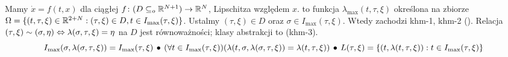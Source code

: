 Mamy $\dot x = f(t,x)$ dla ciągłej $f \colon (D \subseteq_o \mathbb{R}^{N+1}) \to \mathbb{R}^N$, Lipschitza względem $x$.
 to funkcja $\lambda_{\max}(t, \tau, \xi)$ określona na zbiorze $\Omega = \{(t, \tau, \xi) \in \mathbb{R}^{2+N} : (\tau, \xi) \in D, t \in I_{\max}(\tau, \xi)\}$.
Ustalmy $(\tau, \xi) \in D$ oraz $\sigma \in I_{\max}(\tau, \xi)$.
Wtedy zachodzi khm-1, khm-2 ().
Relacja $(\tau, \xi) \sim (\sigma, \eta) \Leftrightarrow \lambda(\sigma, \tau, \xi) = \eta$ na $D$ jest równoważności; klasy abstrakcji to  (khm-3).
\[
	I_{\max}(\sigma, \lambda(\sigma, \tau, \xi)) = I_{\max} (\tau, \xi) \, \bullet \,
	(\forall t \in I_{\max}(\tau, \xi))(\lambda(t, \sigma, \lambda(\sigma, \tau, \xi)) = \lambda(t, \tau, \xi)) \, \bullet \,
	L(\tau, \xi) = \{(t, \lambda(t, \tau, \xi)) : t \in I_{\max}(\tau, \xi)\}
\]

